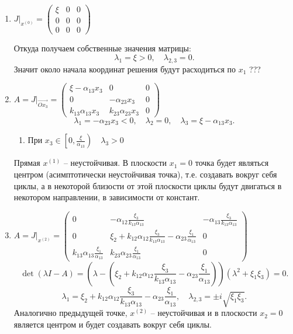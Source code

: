     \begin{enumerate}
        \item \(
            J \big|_{x^{(0)}} = \left(\begin{matrix}
                \xi & 0 & 0 \\
                0 & 0 & 0 \\
                0 & 0  & 0
            \end{matrix}\right)
        \)

        Откуда получаем собственные значения матрицы: 
        \[
            \lambda_1 = \xi > 0, \quad \lambda_{2,3} = 0.
        \]
        Значит около начала координат решения будут расходиться по \( x_1 \) ???

        \item \(
            A = J \big|_{\overrightarrow{Ox_3}} = \left(\begin{matrix}
                \xi - \alpha_{13} x_3 & 0 & 0 \\
                0 & - \alpha_{23} x_3 & 0 \\
                k_{13} \alpha_{13} x_3 & k_{23} \alpha_{23} x_3 & 0
            \end{matrix}\right)
        \)
        \[
            \lambda_1 = - \alpha_{23} x_3 < 0, \quad \lambda_{2} = 0, \quad \lambda_3 = \xi - \alpha_{13} x_3.
        \]
        \begin{enumerate}
            \item При \( x_3 \in \left[ 0, \frac{\xi}{\alpha_{13}} \right) \quad \lambda_3 > 0 \)
        \end{enumerate}

         Прямая  \( x^{(1)} \) -- неустойчивая. В плоскости \( x_1 = 0 \) точка будет являться центром (асимптотически неустойчивая точка), т.е. создавать вокруг себя циклы, а в некоторой близости от этой плоскости циклы будут двигаться в некотором направлении, в зависимости от констант.

        \item \(
            A = J \big|_{x^{(2)}} = \left(\begin{matrix}
                0 & -\alpha_{12} \frac{\xi_3}{k_{13} \alpha_{13}} & -\alpha_{13} \frac{\xi_3}{k_{13} \alpha_{13}} \\[10pt]
                0 & \xi_2 + k_{12} \alpha_{12} \frac{\xi_3}{k_{13} \alpha_{13}} - \alpha_{23}  \frac{\xi_1}{\alpha_{13}} & 0 \\[10pt]
                k_{13} \alpha_{13} \frac{\xi_1}{\alpha_{13}} & k_{23} \alpha_{23} \frac{\xi_1}{\alpha_{13}}  & 0
            \end{matrix}\right)
        \)
        \[
            \det(\lambda I - A) = \left(\lambda - \left(\xi_2 + k_{12} \alpha_{12} \frac{\xi_3}{k_{13} \alpha_{13}} - \alpha_{23}  \frac{\xi_1}{\alpha_{13}} \right) \right)(\lambda^2 + \xi_1 \xi_3) = 0.
        \]
        \[
            \lambda_1 = \xi_2 + k_{12} \alpha_{12} \frac{\xi_3}{k_{13} \alpha_{13}} - \alpha_{23}  \frac{\xi_1}{\alpha_{13}}, \quad \lambda_{2,3} = \pm i \sqrt{\xi_1 \xi_3}.
        \]
        Аналогично предыдущей точке, \( x^{(2)} \) -- неустойчивая и в плоскости \( x_2 = 0 \) является центром и будет создавать вокруг себя циклы.


\end{enumerate}

